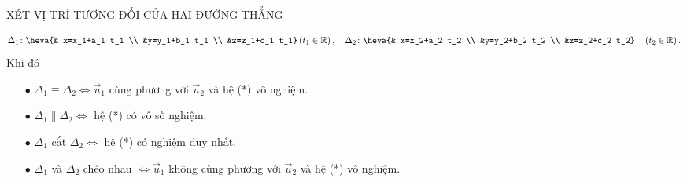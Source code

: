\begin{dang}{XÉT VỊ TRÍ TƯƠNG ĐỐI CỦA HAI ĐƯỜNG THẲNG}
\begin{itemize}
		$$
		\Delta_1 \colon \heva{&
			x=x_1+a_1 t_1 \\
			&y=y_1+b_1 t_1 \\
			&z=z_1+c_1 t_1}\left(t_1 \in \mathbb{R}\right),\quad \Delta_2 \colon \heva{&
			x=x_2+a_2 t_2 \\
			&y=y_2+b_2 t_2 \\
			&z=z_2+c_2 t_2} \quad\left(t_2 \in \mathbb{R}\right).$$
		Khi đó 
		\begin{itemize}
			\item  [$\bullet $] $\Delta_1 \equiv \Delta_2 \Leftrightarrow \overrightarrow{u}_1$ cùng phương với $\overrightarrow{u}_2$ và hệ (*) vô nghiệm.
			\item [$\bullet $] $\Delta_1 \parallel \Delta_2 \Leftrightarrow$ hệ (*) có vô số nghiệm.
			\item [$\bullet $] $\Delta_1$ cắt $\Delta_2 \Leftrightarrow$ hệ (*) có nghiệm duy nhất.
			\item [$\bullet $] $\Delta_1$ và $\Delta_2$ chéo nhau $\Leftrightarrow \overrightarrow{u}_1$ không cùng phương với $\overrightarrow{u}_2$ và hệ (*) vô nghiệm.			
		\end{itemize}
	\end{itemize}
\end{dang}
